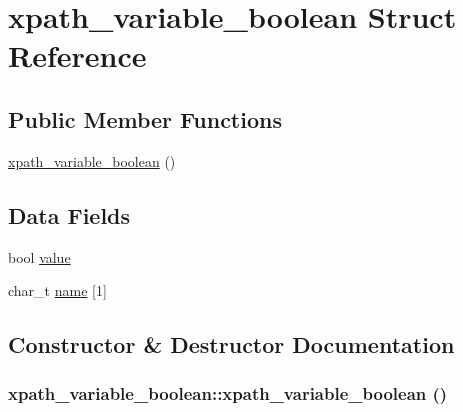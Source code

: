 \hypertarget{structxpath__variable__boolean}{
\section{xpath\_\-variable\_\-boolean Struct Reference}
\label{structxpath__variable__boolean}
}
\subsection*{Public Member Functions}
\begin{CompactItemize}
\item 
\hyperlink{structxpath__variable__boolean_0d846c0137da3ceca54482939af4002c}{xpath\_\-variable\_\-boolean} ()
\end{CompactItemize}
\subsection*{Data Fields}
\begin{CompactItemize}
\item 
bool \hyperlink{structxpath__variable__boolean_b54117a6cced8c3e029724651df4d404}{value}
\item 
char\_\-t \hyperlink{structxpath__variable__boolean_2b2cb81ee5c9a19a667428d08d5bb951}{name} \mbox{[}1\mbox{]}
\end{CompactItemize}


\subsection{Constructor \& Destructor Documentation}
\hypertarget{structxpath__variable__boolean_0d846c0137da3ceca54482939af4002c}{
\subsubsection[xpath\_\-variable\_\-boolean]{\setlength{\rightskip}{0pt plus 5cm}xpath\_\-variable\_\-boolean::xpath\_\-variable\_\-boolean ()}}
\label{structxpath__variable__boolean_0d846c0137da3ceca54482939af4002c}




